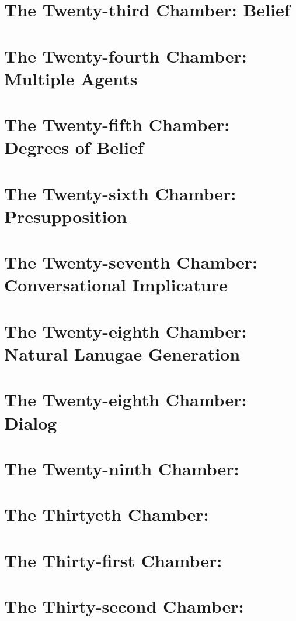 \documentclass{book}[9pt]
\begin{document}
\chapter{The Twenty-third Chamber: Belief}

\chapter{The Twenty-fourth Chamber: Multiple Agents}

\chapter{The Twenty-fifth Chamber: Degrees of Belief}

\chapter{The Twenty-sixth Chamber: Presupposition}

\chapter{The Twenty-seventh Chamber: Conversational Implicature}

\chapter{The Twenty-eighth Chamber: Natural Lanugae Generation}

\chapter{The Twenty-eighth Chamber: Dialog}

\chapter{The Twenty-ninth Chamber: }

\chapter{The Thirtyeth Chamber: }

\chapter{The Thirty-first Chamber: }

\chapter{The Thirty-second Chamber: }
\end{document}
